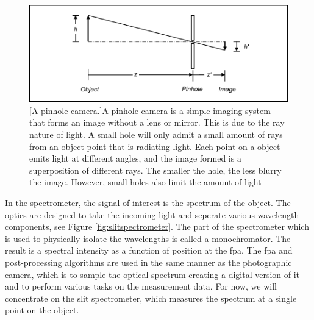 \begin{figure}
    \includegraphics[scale=1]{pinholecamera}
    [A pinhole camera.]{A pinhole camera is a simple imaging system that forms an image without a lens or mirror. This is due to the ray nature of light. A small hole will only admit a small amount of rays from an object point that is radiating light. Each point on a object emits light at different angles, and the image formed is a superposition of different rays. The smaller the hole, the less blurry the image. However, small holes also limit the amount of light}
    \label{fig:pinholecamera}
\end{figure}

In the spectrometer, the signal of interest is the spectrum of the object. The optics are designed to take the incoming light and seperate various wavelength components, see Figure \ref{fig:slitspectrometer}. The part of the spectrometer which is used to physically isolate the wavelengths is called a \gls{monochromator}. The result is a spectral intensity as a function of position at the \gls{fpa}. The \gls{fpa} and post-processing algorithms are used in the same manner as the photographic camera, which is to sample the optical spectrum creating a digital version of it and to perform various tasks on the measurement data. For now, we will concentrate on the slit spectrometer, which measures the spectrum at a single point on the object.


